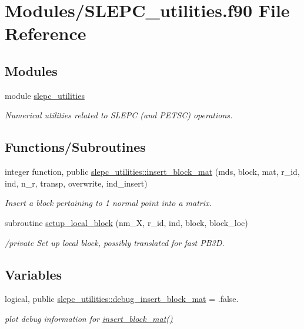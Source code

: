 \hypertarget{SLEPC__utilities_8f90}{}\section{Modules/\+S\+L\+E\+P\+C\+\_\+utilities.f90 File Reference}
\label{SLEPC__utilities_8f90}
\subsection*{Modules}
\begin{DoxyCompactItemize}
\item 
module \hyperlink{namespaceslepc__utilities}{slepc\+\_\+utilities}
\begin{DoxyCompactList}\small\item\em Numerical utilities related to S\+L\+E\+PC (and P\+E\+T\+SC) operations. \end{DoxyCompactList}\end{DoxyCompactItemize}
\subsection*{Functions/\+Subroutines}
\begin{DoxyCompactItemize}
\item 
integer function, public \hyperlink{namespaceslepc__utilities_aa34aa361f0bfff9621ecba179f9ed0c6}{slepc\+\_\+utilities\+::insert\+\_\+block\+\_\+mat} (mds, block, mat, r\+\_\+id, ind, n\+\_\+r, transp, overwrite, ind\+\_\+insert)
\begin{DoxyCompactList}\small\item\em Insert a block pertaining to 1 normal point into a matrix. \end{DoxyCompactList}\item 
subroutine \hyperlink{SLEPC__utilities_8f90_a711d6be49d3b1542ee3375bceb5b4e6d}{setup\+\_\+local\+\_\+block} (nm\+\_\+X, r\+\_\+id, ind, block, block\+\_\+loc)
\begin{DoxyCompactList}\small\item\em /private Set up local block, possibly translated for fast P\+B3D. \end{DoxyCompactList}\end{DoxyCompactItemize}
\subsection*{Variables}
\begin{DoxyCompactItemize}
\item 
logical, public \hyperlink{namespaceslepc__utilities_a5cb92553633cb22ff703286298862ac7}{slepc\+\_\+utilities\+::debug\+\_\+insert\+\_\+block\+\_\+mat} = .false.
\begin{DoxyCompactList}\small\item\em plot debug information for \hyperlink{namespaceslepc__utilities_aa34aa361f0bfff9621ecba179f9ed0c6}{insert\+\_\+block\+\_\+mat()} \end{DoxyCompactList}\end{DoxyCompactItemize}


